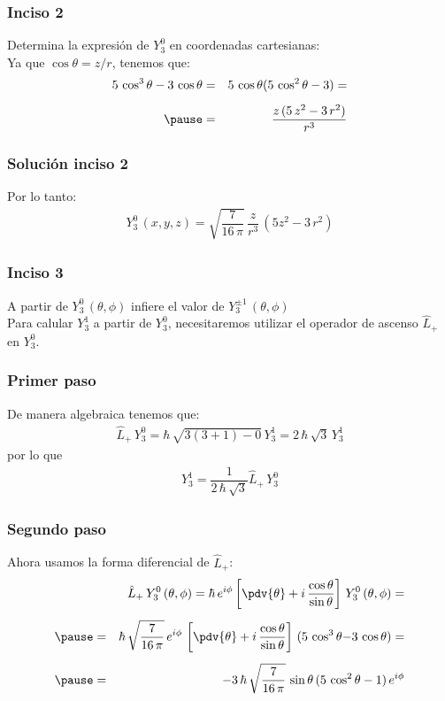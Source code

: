 \begin{frame}
\frametitle{Inciso 2}
Determina la expresión de $Y_{3}^{0}$ en coordenadas cartesianas:
\\
\bigskip
\pause
Ya que $\cos \theta = z/r$, tenemos que:
\begin{eqnarray*}
5 \, \cos^{3} \theta - 3 \, \cos \theta &=& 5 \, \cos \theta(5 \, \cos^{2} \theta - 3) = \\[0.5em] \pause
&=& \dfrac{z \, (5 \, z^{2} - 3 \, r^{2})}{r^{3}}
\end{eqnarray*}
\end{frame}
\begin{frame}
\frametitle{Solución inciso 2}
Por lo tanto:
\pause
\begin{align*}
Y_{3}^{0} \, (x, y, z) = \sqrt{\dfrac{7}{16 \, \pi}} \, \dfrac{z}{r^{3}} \, (5 z^{2} - 3 \, r^{2})
\end{align*}
\end{frame}
\begin{frame}
\frametitle{Inciso 3}
A partir de $Y_{3}^{0} \, (\theta, \phi)$ infiere el valor de $Y_{3}^{\pm 1} \, (\theta, \phi)$
\\
\bigskip
\pause
Para calular $Y_{3}^{1}$ a partir de $Y_{3}^{0}$, necesitaremos utilizar el operador de ascenso $\hat{L}_{+}$ en $Y_{3}^{0}$.
\end{frame}
\begin{frame}
\frametitle{Primer paso}
De manera algebraica tenemos que:
\begin{align}
\hat{L}_{+} \, Y_{3}^{0} = \hbar \, \sqrt{3 (3 + 1) - 0} \, Y_{3}^{1} = 2 \, \hbar \, \sqrt{3} \, Y_{3}^{1}
\label{eq:ecuacion_05_194}
\end{align}
\pause
por lo que
\begin{align}
Y_{3}^{1} = \dfrac{1}{2 \, \hbar \, \sqrt{3}} \hat{L}_{+} \, Y_{3}^{0}
\label{eq:ecuacion_05_195}
\end{align}
\end{frame}
\begin{frame}
\frametitle{Segundo paso}
Ahora usamos la forma diferencial de $\hat{L}_{+}$:
\begin{eqnarray*}
&{}&\hat{L}_{+} \, Y_{3}^{0} \, (\theta, \phi) = \hbar \, e^{i \phi} \left[ \pdv{\theta} + i \, \dfrac{\cos \theta}{\sin \theta} \right] \, Y_{3}^{0} \, (\theta, \phi) = \\[0.5em] \pause
&=& \hbar \, \sqrt{\dfrac{7}{16 \, \pi}} \, e^{i \phi} \, \left[ \pdv{\theta} + i \, \dfrac{\cos \theta}{\sin \theta} \right] \, (5 \, \cos^{3} \theta {-} 3 \, \cos \theta) = \\[0.5em] \pause
&=& - 3 \, \hbar \, \sqrt{\dfrac{7}{16 \, \pi}} \, \sin \theta \, (5 \, \cos^{2} \theta - 1) \, e^{i \phi}
\end{eqnarray*}
\end{frame}
